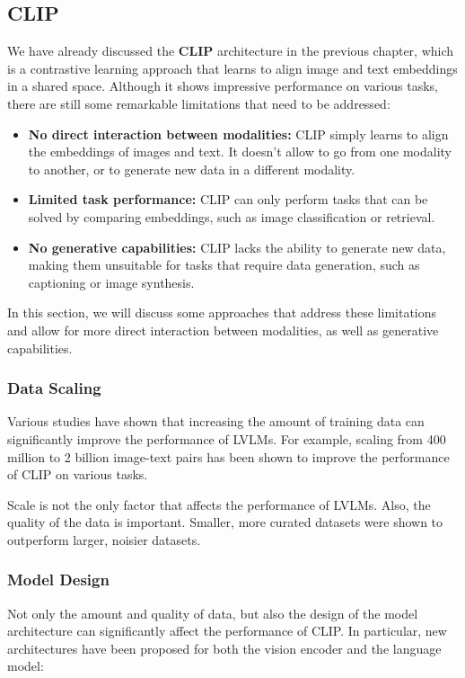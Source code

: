 \subsection{CLIP}
We have already discussed the \textbf{CLIP} architecture in the previous chapter, which is a contrastive learning approach that learns to align image and text embeddings in a shared space.
Although it shows impressive performance on various tasks, there are still some remarkable limitations that need to be addressed:
\begin{itemize}
    \item \textbf{No direct interaction between modalities:} CLIP simply learns to align the embeddings of images and text.
    It doesn't allow to go from one modality to another, or to generate new data in a different modality.
    \item \textbf{Limited task performance:} CLIP can only perform tasks that can be solved by comparing embeddings, such as image classification or retrieval.
    \item \textbf{No generative capabilities:} CLIP lacks the ability to generate new data, making them unsuitable for tasks that require data generation, such as captioning or image synthesis.
\end{itemize}

In this section, we will discuss some approaches that address these limitations and allow for more direct interaction between modalities, as well as generative capabilities.

\subsubsection{Data Scaling}
Various studies have shown that increasing the amount of training data can significantly improve the performance of LVLMs.
For example, scaling from 400 million to 2 billion image-text pairs has been shown to improve the performance of CLIP on various tasks.

Scale is not the only factor that affects the performance of LVLMs. Also, the quality of the data is important. 
Smaller, more curated datasets were shown to outperform larger, noisier datasets.

\subsubsection{Model Design}
Not only the amount and quality of data, but also the design of the model architecture can significantly affect the performance of CLIP.
In particular, new architectures have been proposed for both the vision encoder and the language model:


